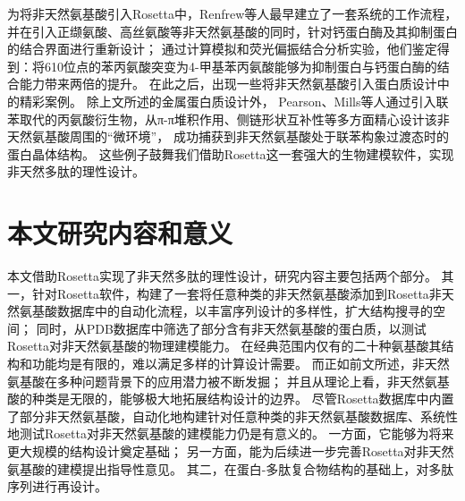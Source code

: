 为将非天然氨基酸引入Rosetta中，Renfrew等人\cite{RN71}最早建立了一套系统的工作流程，
并在引入正缬氨酸、高丝氨酸等非天然氨基酸的同时，针对钙蛋白酶及其抑制蛋白的结合界面进行重新设计；
通过计算模拟和荧光偏振结合分析实验，他们鉴定得到：将610位点的苯丙氨酸突变为4-甲基苯丙氨酸能够为抑制蛋白与钙蛋白酶的结合能力带来两倍的提升。
在此之后，出现一些将非天然氨基酸引入蛋白质设计中的精彩案例。
除上文所述的金属蛋白质设计外，
Pearson、Mills等人\cite{RN104}通过引入联苯取代的丙氨酸衍生物，从π-π堆积作用、侧链形状互补性等多方面精心设计该非天然氨基酸周围的“微环境”，
成功捕获到非天然氨基酸处于联苯构象过渡态时的蛋白晶体结构。
这些例子鼓舞我们借助Rosetta这一套强大的生物建模软件，实现非天然多肽的理性设计。



\section{本文研究内容和意义}

本文借助Rosetta实现了非天然多肽的理性设计，研究内容主要包括两个部分。
其一，针对Rosetta软件，构建了一套将任意种类的非天然氨基酸添加到Rosetta非天然氨基酸数据库中的自动化流程，以丰富序列设计的多样性，扩大结构搜寻的空间；
同时，从PDB数据库中筛选了部分含有非天然氨基酸的蛋白质，以测试Rosetta对非天然氨基酸的物理建模能力。
在经典范围内仅有的二十种氨基酸其结构和功能均是有限的，难以满足多样的计算设计需要。
而正如前文所述，非天然氨基酸在多种问题背景下的应用潜力被不断发掘；
并且从理论上看，非天然氨基酸的种类是无限的，能够极大地拓展结构设计的边界。
尽管Rosetta数据库中内置了部分非天然氨基酸，自动化地构建针对任意种类的非天然氨基酸数据库、系统性地测试Rosetta对非天然氨基酸的建模能力仍是有意义的。
一方面，它能够为将来更大规模的结构设计奠定基础；
另一方面，能为后续进一步完善Rosetta对非天然氨基酸的建模提出指导性意见。
其二，在蛋白-多肽复合物结构的基础上，对多肽序列进行再设计。


